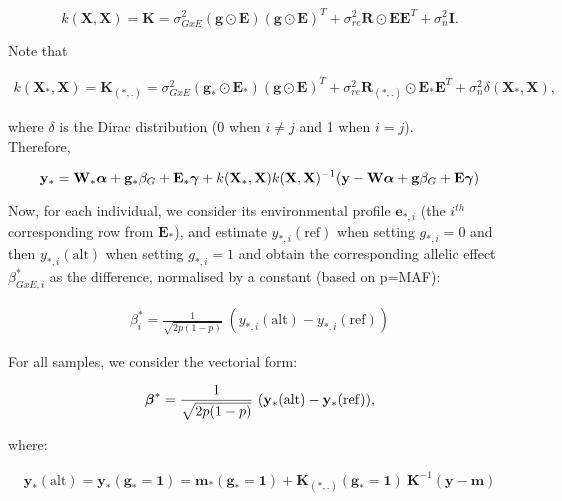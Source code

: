 \begin{equation}\label{eq:K_predict}
    k(\mathbf{X},\mathbf{X}) = \mathbf{K} = \sigma_{GxE}^2(\mathbf{g}\odot\mathbf{E})(\mathbf{g}\odot\mathbf{E})^T + \sigma_{re}^2 \mathbf{R} \odot \mathbf{E}\mathbf{E}^T + \sigma_n^2 \mathbf{I}.
\end{equation}

Note that

\begin{align}
    k(\mathbf{X}_*,\mathbf{X}) = \mathbf{K}_{(*,.)} =  \sigma_{GxE}^2(\mathbf{g}_*\odot\mathbf{E}_*)(\mathbf{g}\odot\mathbf{E})^T +
        \sigma_{re}^2 \mathbf{R}_{(*,.)} \odot \mathbf{E}_*\mathbf{E}^T + \sigma_n^2 \delta(\mathbf{X}_*,\mathbf{X}),
\end{align}

where $\delta$ is the Dirac distribution (0 when $i \neq j$ and 1 when $i = j$). \\

Therefore,

\begin{equation}
    \mathbf{y}_* = \mathbf{W}_*\boldsymbol{\alpha} + \mathbf{g}_* \beta_G + \mathbf{E}_* \boldsymbol{\gamma} + k(\mathbf{X}_*,\mathbf{X}) k(\mathbf{X},\mathbf{X})^{-1} (\mathbf{y}-\mathbf{W}\boldsymbol{\alpha} + \mathbf{g} \beta_G + \mathbf{E} \boldsymbol{\gamma})
\end{equation}

Now, for each individual, we consider its environmental profile $\mathbf{e}_{*,i}$ (the $i^{th}$ corresponding row from $\mathbf{E}_*$), and estimate $y_{*,i} (\mathrm{ref})$ when setting $g_{*,i}=0$ and then $y_{*,i} (\mathrm{alt})$ when setting $g_{*,i}=1$ and obtain the corresponding allelic effect $\beta_{GxE,i}^*$ as the difference, normalised by a constant (based on p=MAF):

\begin{align}
    \beta_{i}^* = \frac{1}{\sqrt{2p(1-p)}} \ (y_{*,i} (\mathrm{alt}) - y_{*,i} (\mathrm{ref}))
\end{align}

For all samples, we consider the vectorial form: 

\begin{equation}\label{eq:beta*}
    \boldsymbol{\beta}^* = \frac{1}{\sqrt{2p(1-p)}} \ (\mathbf{y}_*(\mathrm{alt}) - \mathbf{y}_*(\mathrm{ref})),
\end{equation}

where:

\begin{align}
    \mathbf{y}_*(\mathrm{alt}) = \mathbf{y}_*(\mathbf{g}_*=\mathbf{1}) = \mathbf{m}_*(\mathbf{g}_*=\mathbf{1}) + \mathbf{K}_{(*,.)}(\mathbf{g}_*=\mathbf{1}) \ \mathbf{K}^{-1} (\mathbf{y}-\mathbf{m})
\end{align}

